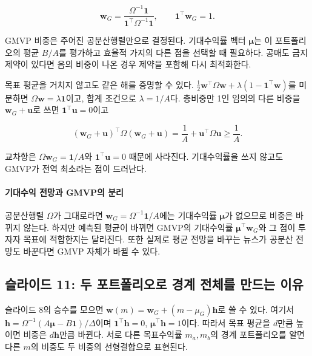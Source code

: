 \documentclass[11pt,a4paper]{article}
\begin{document}
\[
\mathbf w_G=\frac{\Omega^{-1}\mathbf1}{\mathbf1^\top\Omega^{-1}\mathbf1},
\qquad \mathbf1^\top\mathbf w_G=1.
\]

GMVP 비중은 주어진 공분산행렬만으로 결정된다. 기대수익률 벡터 $\boldsymbol\mu$는 이 포트폴리오의 평균 $B/A$를 평가하고 효율적 가지의 다른 점을 선택할 때 필요하다. 공매도 금지 제약이 있다면 음의 비중이 나온 경우 제약을 포함해 다시 최적화한다.
\par

목표 평균을 거치지 않고도 같은 해를 증명할 수 있다. $\tfrac12\mathbf w^\top\Omega\mathbf w+\lambda(1-\mathbf1^\top\mathbf w)$를 미분하면 $\Omega\mathbf w=\lambda\mathbf1$이고, 합계 조건으로 $\lambda=1/A$다. 총비중만 1인 임의의 다른 비중을 $\mathbf w_G+\mathbf u$로 쓰면 $\mathbf1^\top\mathbf u=0$이고
\par

\[
(\mathbf w_G+\mathbf u)^\top\Omega(\mathbf w_G+\mathbf u)
=\frac1A+\mathbf u^\top\Omega\mathbf u\ge\frac1A.
\]

교차항은 $\Omega\mathbf w_G=\mathbf1/A$와 $\mathbf1^\top\mathbf u=0$ 때문에 사라진다. 기대수익률을 쓰지 않고도 GMVP가 전역 최소라는 점이 드러난다.
\par

\paragraph{기대수익 전망과 GMVP의 분리}

공분산행렬 $\Omega$가 그대로라면 $\mathbf w_G=\Omega^{-1}\mathbf1/A$에는 기대수익률 $\boldsymbol\mu$가 없으므로 비중은 바뀌지 않는다. 하지만 예측된 평균이 바뀌면 GMVP의 기대수익률 $\boldsymbol\mu^\top\mathbf w_G$와 그 점이 투자자 목표에 적합한지는 달라진다. 또한 실제로 평균 전망을 바꾸는 뉴스가 공분산 전망도 바꾼다면 GMVP 자체가 바뀔 수 있다.
\par

\subsection{슬라이드 11: 두 포트폴리오로 경계 전체를 만드는 이유}

슬라이드 8의 승수를 모으면 $\mathbf w(m)=\mathbf w_G+(m-\mu_G)\mathbf h$로 쓸 수 있다. 여기서 $\mathbf h=\Omega^{-1}(A\boldsymbol\mu-B\mathbf1)/\Delta$이며 $\mathbf1^\top\mathbf h=0$, $\boldsymbol\mu^\top\mathbf h=1$이다. 따라서 목표 평균을 $d$만큼 높이면 비중은 $d\mathbf h$만큼 바뀐다. 서로 다른 목표수익률 $m_a,m_b$의 경계 포트폴리오를 알면 다른 $m$의 비중도 두 비중의 선형결합으로 표현된다.
\par
\end{document}
